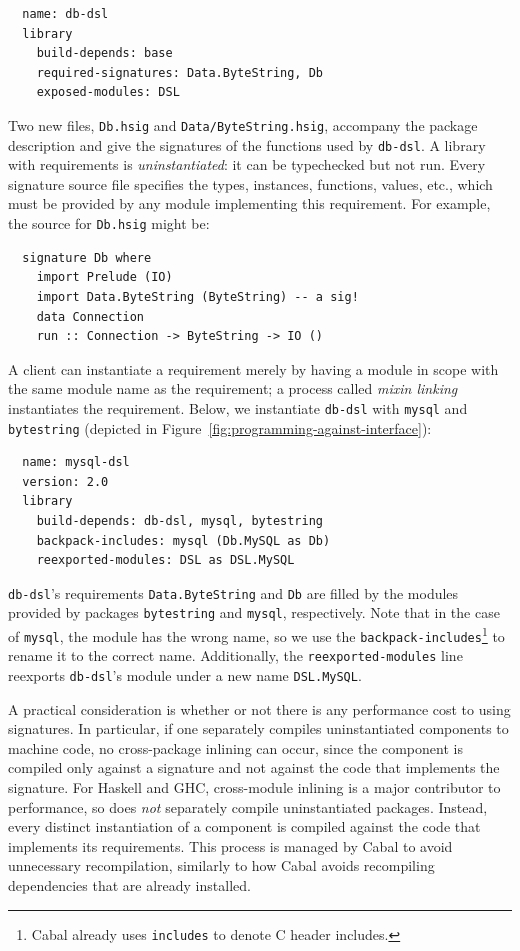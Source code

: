 \begin{verbatim}
  name: db-dsl
  library
    build-depends: base
    required-signatures: Data.ByteString, Db
    exposed-modules: DSL
\end{verbatim}
Two new files, \verb|Db.hsig| and \verb|Data/ByteString.hsig|, accompany the package description and give
the signatures of the functions used by \verb|db-dsl|.
A library with requirements is \emph{uninstantiated}: it can be typechecked but not
run.  Every signature source file specifies the types, instances, functions, values, etc., which must be provided
by any module implementing this requirement.  For example, the source for
\verb|Db.hsig| might be:

\begin{verbatim}
  signature Db where
    import Prelude (IO)
    import Data.ByteString (ByteString) -- a sig!
    data Connection
    run :: Connection -> ByteString -> IO ()
\end{verbatim}
%
A client can instantiate a requirement merely by having a module
in scope with the same module name as the requirement; a process called \emph{mixin linking} instantiates the requirement.  Below, we instantiate \verb|db-dsl| with \verb|mysql| and
\verb|bytestring| (depicted in Figure~\ref{fig:programming-against-interface}):

\begin{verbatim}
  name: mysql-dsl
  version: 2.0
  library
    build-depends: db-dsl, mysql, bytestring
    backpack-includes: mysql (Db.MySQL as Db)
    reexported-modules: DSL as DSL.MySQL
\end{verbatim}
%
\verb|db-dsl|'s requirements \verb|Data.ByteString| and \verb|Db| are
filled by the modules provided by packages \verb|bytestring| and \verb|mysql|,
respectively.  Note that in the case of \verb|mysql|, the module has the wrong
name, so we use the \verb|backpack-includes|\footnote{Cabal already uses
\texttt{includes} to denote C header includes.} to rename it to the correct name.
Additionally, the \verb|reexported-modules| line
reexports \verb|db-dsl|'s module under a new name \verb|DSL.MySQL|.

A practical consideration is whether or not there is any performance
cost to using signatures.  In particular, if one separately compiles
uninstantiated components to machine code, no cross-package inlining
can occur, since the component is compiled only against a signature
and not against the code that implements the signature.
For Haskell and GHC, cross-module inlining is a major contributor to performance,
so \Backpack{} does \emph{not}
separately compile uninstantiated packages. Instead, every distinct
instantiation of a component is compiled against the code that implements
its requirements. This process is managed by
Cabal to avoid unnecessary recompilation, similarly to how Cabal
avoids recompiling dependencies that are already installed.

